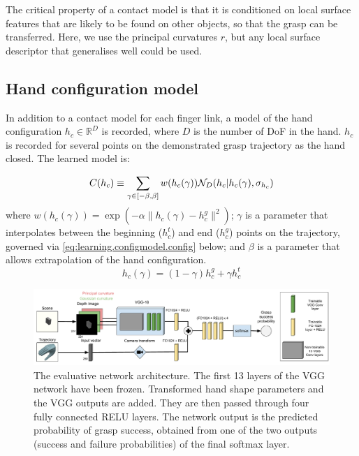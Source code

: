 The critical property of a contact model is that it is conditioned on local surface features that are likely to be found on other objects, so that the grasp can be transferred. Here, we use the principal curvatures $r$, but any local surface descriptor that generalises well could be used. %
%

\subsection{Hand configuration model}
In addition to a contact model for each finger link, a model of the hand configuration $h_c \in \mathbb R^D$ is recorded, where $D$ is the number of DoF in the hand. $h_c$  is recorded for several points on the demonstrated grasp trajectory as the hand closed. The learned model is:

\begin{equation}
\hc(h_c) \equiv \sum_{\gamma \in [-\beta, \beta]} w({h_c(\gamma)}) \mathcal{N}_D(h_c|h_c(\gamma), \sigma_{h_c}) 
\label{eq:hc}
\end{equation}
where $w({h_c(\gamma)}) = \exp(-\alpha \|h_c(\gamma) - h^g_c \|^2)$; $\gamma$ is a parameter that interpolates between the beginning ($h^t_c$) and end ($h^g_c$) points on the trajectory, governed via \eq\ref{eq:learning.configmodel.config} below; and $\beta$ is a parameter that allows extrapolation of the hand configuration.
\begin{equation}
h_c(\gamma) = (1 - \gamma)h^g_c + \gamma h^t_c
\label{eq:learning.configmodel.config}
\end{equation}
\begin{figure}[t]
  \includegraphics[width=\textwidth]{images/networkArchitecture.pdf}
  \caption{The evaluative network architecture. The first 13 layers of the VGG network have been frozen. Transformed hand shape parameters and the VGG outputs are added. They are then passed through four fully connected RELU layers. The network output is the predicted probability of grasp success, obtained from one of the two outputs (success and failure probabilities) of the final softmax layer.}
\label{fig:networkArchitecture}
\end{figure}
